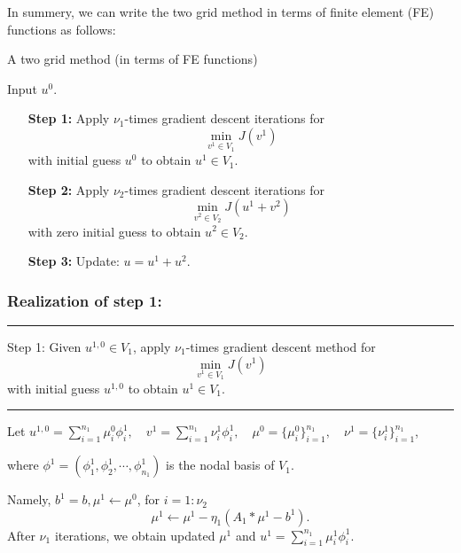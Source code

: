 In summery, we can write the two grid method in terms of finite element (FE) functions as follows:
\begin{algorithm}\caption{A two grid method (in terms of FE functions)}
Input $u^0$.
\begin{enumerate}
\item [{\bf Step 1:}] Apply $\nu_1$-times gradient descent iterations for 
$$
\min_{v^1\in V_1} J(v^1)
$$
with initial guess $u^0$ to obtain $u^1\in V_1$.
\item [{\bf Step 2:}]  Apply $\nu_2$-times gradient descent iterations for 
$$
\min_{v^2\in V_2} J(u^1+v^2)
$$
with zero initial guess to obtain $u^2\in V_2$.
\item [{\bf Step 3:}]  Update: $u=u^1+u^2$.
\end{enumerate}
\end{algorithm}
 
\newpage

\subsubsection{Realization of step 1:} 
\smallskip\hrule \smallskip 

Step 1: Given $u^{1,0}\in V_1$, apply $\nu_1$-times gradient descent method for 
$$
\min_{v^1\in V_1} J(v^1)
$$
with initial guess $u^{1,0}$ to obtain $u^1\in V_1$.
\smallskip\hrule \smallskip 


Let $\displaystyle u^{1,0}=\sum_{i=1}^{n_1}\mu^0_i\phi_i^1,\quad v^1=\sum_{i=1}^{n_1}\nu^1_i\phi_i^1,\quad  \mu^0=\{\mu^0_i\}^{n_1}_{i=1},\quad  \nu^1=\{\nu^1_i\}^{n_1}_{i=1}$,

where $\phi^1=(\phi^1_1,\phi^1_2,\cdots,\phi^1_{n_1})$
is the nodal basis of $V_1$. 

Namely, $b^1=b, \mu^1\leftarrow \mu^0$,  for $i=1:\nu_2$ 
$$
\mu^1\leftarrow  \mu^1-\eta_1 (A_1\ast \mu^1-b^1).
$$
After $\nu_1$ iterations, we obtain updated $\mu^1$ and $\displaystyle  u^1=\sum_{i=1}^{n_1}\mu^1_i\phi_i^1$.

